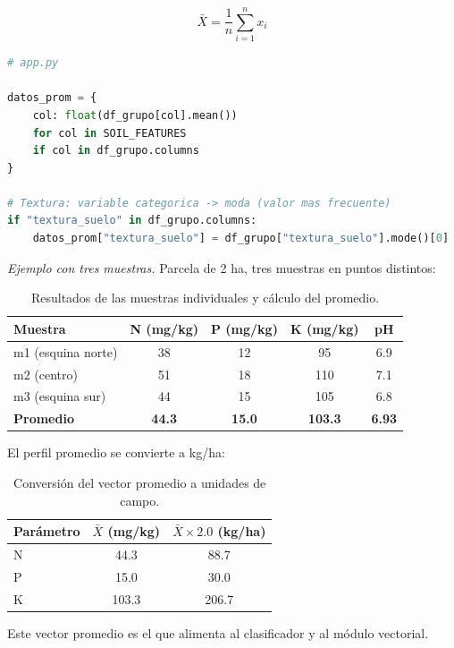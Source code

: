 \documentclass[12pt]{article}
\begin{document}
$$\bar{X} = \frac{1}{n} \sum_{i=1}^{n} x_i$$
\begin{lstlisting}[language=Python]
# app.py

datos_prom = {
    col: float(df_grupo[col].mean())
    for col in SOIL_FEATURES
    if col in df_grupo.columns
}

# Textura: variable categorica -> moda (valor mas frecuente)
if "textura_suelo" in df_grupo.columns:
    datos_prom["textura_suelo"] = df_grupo["textura_suelo"].mode()[0]
\end{lstlisting}

\medskip
\noindent\textit{Ejemplo con tres muestras.} Parcela de 2 ha, tres muestras en puntos distintos:

\begin{table}[htpb]
\centering
\caption{Resultados de las muestras individuales y cálculo del promedio.}
\label{tab:muestras_promedio}
\begin{tabular}{lcccc}
\toprule
\textbf{Muestra} & \textbf{N (mg/kg)} & \textbf{P (mg/kg)} & \textbf{K (mg/kg)} & \textbf{pH} \\
\midrule
m1 (esquina norte) & 38   & 12   &  95   & 6.9  \\
m2 (centro)        & 51   & 18   & 110   & 7.1  \\
m3 (esquina sur)   & 44   & 15   & 105   & 6.8  \\
\midrule
\textbf{Promedio}  & \textbf{44.3} & \textbf{15.0} & \textbf{103.3} & \textbf{6.93} \\
\bottomrule
\end{tabular}
\end{table}

El perfil promedio se convierte a kg/ha:

\begin{table}[htpb]
\centering
\caption{Conversión del vector promedio a unidades de campo.}
\label{tab:conversion_promedio}
\begin{tabular}{lcc}
\toprule
\textbf{Parámetro} & \textbf{$\bar{X}$ (mg/kg)} & \textbf{$\bar{X} \times 2.0$ (kg/ha)} \\
\midrule
N & 44.3  &  88.7  \\
P & 15.0  &  30.0  \\
K & 103.3 & 206.7  \\
\bottomrule
\end{tabular}
\end{table}

Este vector promedio es el que alimenta al clasificador y al módulo vectorial.
\end{document}
